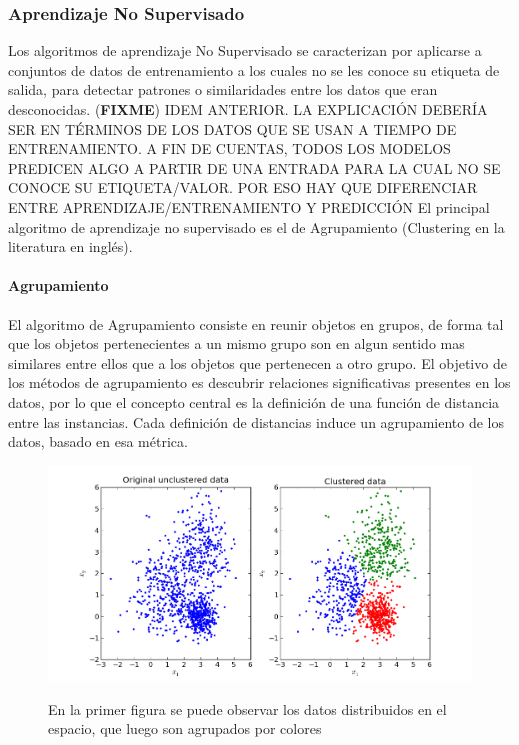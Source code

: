 \documentclass[a4paper,11pt,spanish]{book}
\newcommand*{\FIXME}[1]{{(\textbf{FIXME}) {#1}}}
\begin{document}
      \subsubsection{Aprendizaje No Supervisado}
	  Los algoritmos de aprendizaje No Supervisado se caracterizan por aplicarse a conjuntos de datos de entrenamiento a los cuales no se les conoce su etiqueta de salida,
	  para detectar patrones o similaridades entre los datos que eran
          desconocidas. \FIXME{IDEM ANTERIOR. LA EXPLICACIÓN DEBERÍA SER EN
            TÉRMINOS DE LOS DATOS QUE SE USAN A TIEMPO DE ENTRENAMIENTO. A FIN
            DE CUENTAS, TODOS LOS MODELOS PREDICEN ALGO A PARTIR DE UNA ENTRADA
            PARA LA CUAL NO SE CONOCE SU ETIQUETA/VALOR. POR ESO HAY QUE
            DIFERENCIAR ENTRE APRENDIZAJE/ENTRENAMIENTO Y PREDICCIÓN}
	  El principal algoritmo de aprendizaje no supervisado es el de Agrupamiento (Clustering en la literatura en inglés).
	\paragraph {Agrupamiento}
	   El algoritmo de Agrupamiento consiste en reunir objetos en grupos, de forma tal que los objetos pertenecientes a un mismo grupo son en algun sentido mas similares
	   entre ellos que a los objetos que pertenecen a otro grupo. El objetivo de los métodos de agrupamiento es descubrir relaciones significativas presentes en los datos, por lo
	   que el concepto central es la definición de una función de distancia entre las instancias. Cada definición de distancias induce un agrupamiento de los datos, basado en esa métrica.

	  \begin{figure}[h]
	    \includegraphics[scale=0.5]{./img/stackoverflow_clustering.png}\\
	    \caption{En la primer figura se puede observar los datos distribuidos en el espacio, que luego son agrupados por colores}
	    \label{fig:clustering}
	  \end{figure}
\end{document}
